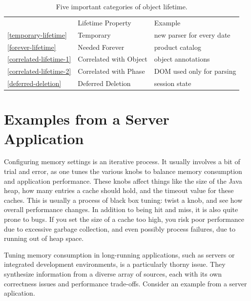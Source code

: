 \begin{table}
\centering
	\begin{tabular}{lp{}p{}}
	\toprule  & Lifetime Property & Example \\ \cmidrule(r){2-2} \cmidrule(l){3-3}
	\autoref{temporary-lifetime}  & {Temporary} & new
	parser for every date
	\\
	\autoref{forever-lifetime} & {Needed Forever} & product catalog
	\\
	\autoref{correlated-lifetime-1} & {Correlated with Object}
	& object annotations
	\\
	\autoref{correlated-lifetime-2} & {Correlated with Phase} &
	DOM used only for parsing
	\\
	\autoref{deferred-deletion} & {Deferred Deletion} &
	session state \\
	\bottomrule
	\end{tabular}
	\caption{Five important categories of object lifetime.}
	\label{tab:five-lifetimes}
\end{table}

\section{Examples from a Server Application}

Configuring memory settings is an iterative process. It usually involves a bit of
trial and error, as one tunes the various knobs to balance memory consumption and
application performance. These knobs affect things like the size of the Java
heap, how many entries a cache should hold, and the timeout value for these
caches. This is usually a process of black box tuning: twist a knob, and see
how overall performance changes. In addition to being hit
and miss, it is also quite prone to bugs. If you set the size of a cache too
high, you risk poor performance due to excessive garbage collection, and even
possibly process failures, due to running out of heap space.

Tuning memory consumption in long-running applications, such as servers or
integrated development environments, is a particularly thorny issue. They
synthesize information from a diverse array of sources, each with its own
correctness issues and performance trade-offs. Consider an example from a server
aplication.

